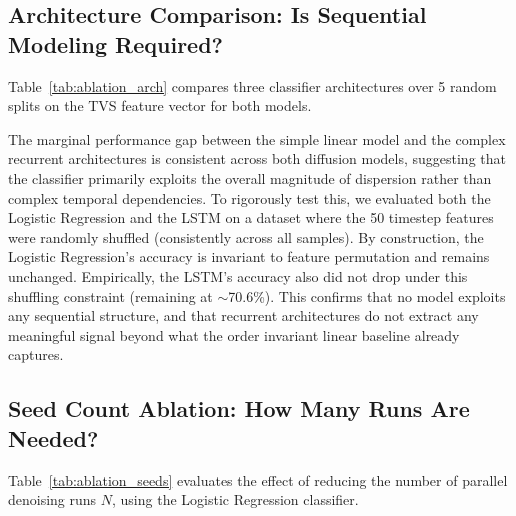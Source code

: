\documentclass[11pt]{article}
\begin{document}
\subsection{Architecture Comparison: Is Sequential Modeling Required?}
Table~\ref{tab:ablation_arch} compares three classifier architectures over 5 random splits on the TVS feature vector for both models.

\begin{table}[h]
\centering
{}
\caption{Architecture comparison over 5 random splits. On both models, all confidence intervals overlap substantially. The gap between LR and the Bidirectional LSTM is $0.88\%$ on LLaDA and $1.27\%$ on Dream, confirming that sequential modeling adds negligible benefit across architectures.}
\label{tab:ablation_arch}
\end{table}

The marginal performance gap between the simple linear model and the complex recurrent architectures is consistent across both diffusion models, suggesting that the classifier primarily exploits the overall magnitude of dispersion rather than complex temporal dependencies. To rigorously test this, we evaluated both the Logistic Regression and the LSTM on a dataset where the 50 timestep features were randomly shuffled (consistently across all samples). By construction, the Logistic Regression's accuracy is invariant to feature permutation and remains unchanged. Empirically, the LSTM's accuracy also did not drop under this shuffling constraint (remaining at $\sim$70.6\%). This confirms that no model exploits any sequential structure, and that recurrent architectures do not extract any meaningful signal beyond what the order invariant linear baseline already captures.


\subsection{Seed Count Ablation: How Many Runs Are Needed?}
Table~\ref{tab:ablation_seeds} evaluates the effect of reducing the number of parallel denoising runs $N$, using the Logistic Regression classifier.
\end{document}
